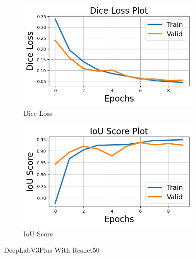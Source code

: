 \documentclass[12pt]{article}
\begin{document}
\begin{figure}[H]
  \begin{subfigure}[b]{0.5\textwidth}
    \includegraphics[width=\textwidth]{Figs/deepwithresnetdice.png}
    \caption{Dice Loss}
    \label{fig:f1}
  \end{subfigure}
  \hfill
  \begin{subfigure}[b]{0.5\textwidth}
    \includegraphics[width=\textwidth]{Figs/deepwithresnetiou.png}
    \caption{IoU Score}
    \label{fig:f2}
  \end{subfigure}
  \caption{DeepLabV3Plus With Resnet50}
\end{figure}
\end{document}
